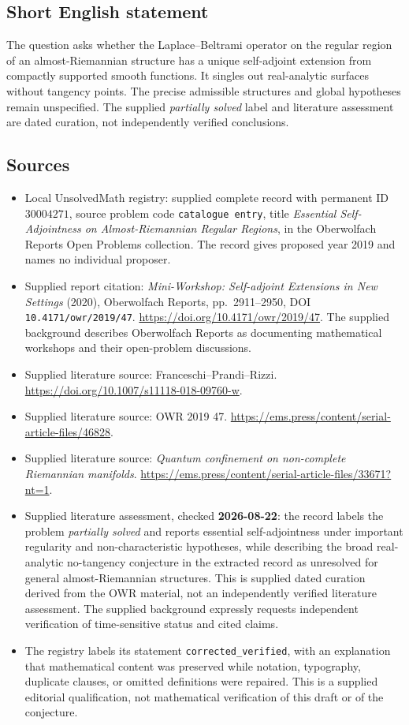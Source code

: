 \documentclass[11pt]{article}
\begin{document}
\subsection{Short English statement}
The question asks whether the Laplace--Beltrami operator on the regular region of an almost-Riemannian structure has a unique self-adjoint extension from compactly supported smooth functions. It singles out real-analytic surfaces without tangency points. The precise admissible structures and global hypotheses remain unspecified. The supplied \emph{partially solved} label and literature assessment are dated curation, not independently verified conclusions.
\subsection{Sources}
\begin{itemize}
\item Local UnsolvedMath registry: supplied complete record with permanent ID \(30004271\), source problem code \texttt{catalogue entry}, title \emph{Essential Self-Adjointness on Almost-Riemannian Regular Regions}, in the Oberwolfach Reports Open Problems collection. The record gives proposed year 2019 and names no individual proposer.
\item Supplied report citation: \emph{Mini-Workshop: Self-adjoint Extensions in New Settings} (2020), Oberwolfach Reports, pp.~2911--2950, DOI \texttt{10.4171/owr/2019/47}. \url{https://doi.org/10.4171/owr/2019/47}. The supplied background describes Oberwolfach Reports as documenting mathematical workshops and their open-problem discussions.
\item Supplied literature source: Franceschi--Prandi--Rizzi. \url{https://doi.org/10.1007/s11118-018-09760-w}.
\item Supplied literature source: OWR 2019 47. \url{https://ems.press/content/serial-article-files/46828}.
\item Supplied literature source: \emph{Quantum confinement on non-complete Riemannian manifolds}. \url{https://ems.press/content/serial-article-files/33671?nt=1}.
\item Supplied literature assessment, checked \textbf{2026-08-22}: the record labels the problem \emph{partially solved} and reports essential self-adjointness under important regularity and non-characteristic hypotheses, while describing the broad real-analytic no-tangency conjecture in the extracted record as unresolved for general almost-Riemannian structures. This is supplied dated curation derived from the OWR material, not an independently verified literature assessment. The supplied background expressly requests independent verification of time-sensitive status and cited claims.
\item The registry labels its statement \texttt{corrected\_verified}, with an explanation that mathematical content was preserved while notation, typography, duplicate clauses, or omitted definitions were repaired. This is a supplied editorial qualification, not mathematical verification of this draft or of the conjecture.
\end{itemize}
\end{document}
